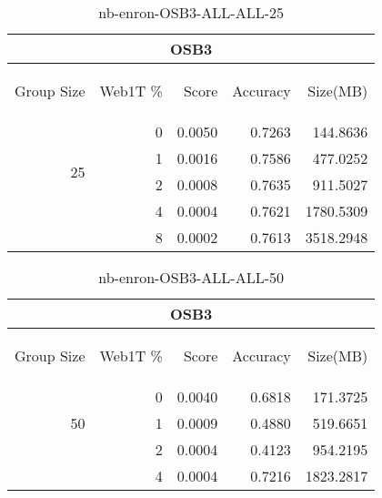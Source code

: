 \begin{center}
\begin{table}[htbp]
\begin{tabular}{ | r | r | r | r | r |}
\hline
\multicolumn{5}{|c|}{OSB3}\\
\hline
\begin{sideways}Group Size\end{sideways} & \begin{sideways}Web1T \%\end{sideways} & \begin{sideways}Score\end{sideways} & \begin{sideways}Accuracy\end{sideways} & \begin{sideways}Size(MB)\end{sideways}\\
\hline
\multirow{4}{*}{25}
 & 0 & 0.0050 & 0.7263 & 144.8636\\ \cline{2-5}
 & 1 & 0.0016 & 0.7586 & 477.0252\\ \cline{2-5}
 & 2 & 0.0008 & 0.7635 & 911.5027\\ \cline{2-5}
 & 4 & 0.0004 & 0.7621 & 1780.5309\\ \cline{2-5}
 & 8 & 0.0002 & 0.7613 & 3518.2948\\ \cline{2-5}
\hline
\end{tabular}
\caption{nb-enron-OSB3-ALL-ALL-25}
\label{table:nb-enron-OSB3-ALL-ALL-25}
\end{table}
\end{center}

\begin{center}
\begin{table}[htbp]
\begin{tabular}{ | r | r | r | r | r |}
\hline
\multicolumn{5}{|c|}{OSB3}\\
\hline
\begin{sideways}Group Size\end{sideways} & \begin{sideways}Web1T \%\end{sideways} & \begin{sideways}Score\end{sideways} & \begin{sideways}Accuracy\end{sideways} & \begin{sideways}Size(MB)\end{sideways}\\
\hline
\multirow{3}{*}{50}
 & 0 & 0.0040 & 0.6818 & 171.3725\\ \cline{2-5}
 & 1 & 0.0009 & 0.4880 & 519.6651\\ \cline{2-5}
 & 2 & 0.0004 & 0.4123 & 954.2195\\ \cline{2-5}
 & 4 & 0.0004 & 0.7216 & 1823.2817\\ \cline{2-5}
\hline
\end{tabular}
\caption{nb-enron-OSB3-ALL-ALL-50}
\label{table:nb-enron-OSB3-ALL-ALL-50}
\end{table}
\end{center}

